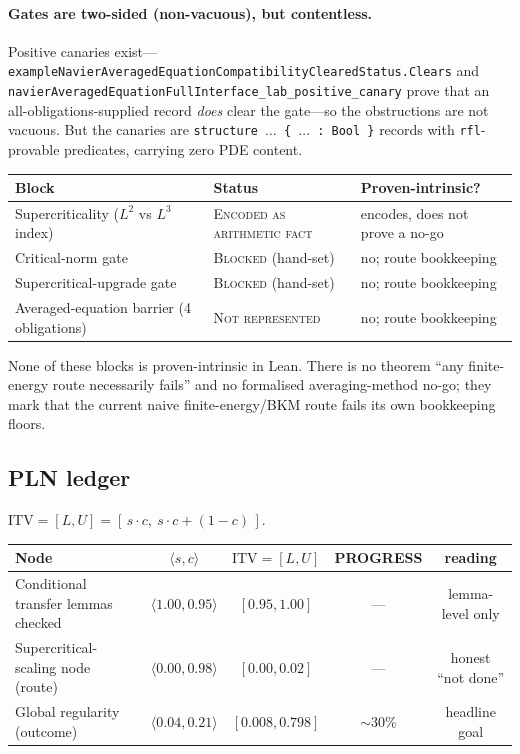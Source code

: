 \paragraph{Gates are two-sided (non-vacuous), but contentless.} Positive
canaries exist---\texttt{exampleNavierAveragedEquationCompatibilityClearedStatus.Clears}
and \texttt{navierAveragedEquationFullInterface\_lab\_positive\_canary} prove
that an all-obligations-supplied record \emph{does} clear the gate---so the
obstructions are not vacuous. But the canaries are
\texttt{structure $\dots$ \{ $\dots$ : Bool \}} records with \texttt{rfl}-provable
predicates, carrying zero PDE content.

\begin{center}
\begin{tabular}{lll}
\hline
Block & Status & Proven-intrinsic? \\
\hline
Supercriticality ($L^2$ vs $L^3$ index) & \textsc{Encoded as arithmetic fact} & encodes, does not prove a no-go \\
Critical-norm gate & \textsc{Blocked} (hand-set) & no; route bookkeeping \\
Supercritical-upgrade gate & \textsc{Blocked} (hand-set) & no; route bookkeeping \\
Averaged-equation barrier (4 obligations) & \textsc{Not represented} & no; route bookkeeping \\
\hline
\end{tabular}
\end{center}

\noindent None of these blocks is proven-intrinsic in Lean. There is no theorem
``any finite-energy route necessarily fails'' and no formalised averaging-method
no-go; they mark that the current naive finite-energy/BKM route fails its own
bookkeeping floors.

\subsection{PLN ledger}
\label{sec:ns-pln}

$\mathrm{ITV}=[L,U]=[\,s\cdot c,\ s\cdot c+(1-c)\,]$.

\begin{center}
\begin{tabular}{lcccc}
\hline
Node & $\langle s,c\rangle$ & $\mathrm{ITV}=[L,U]$ & PROGRESS & reading \\
\hline
Conditional transfer lemmas checked & $\langle 1.00,0.95\rangle$ & $[0.95,1.00]$ & --- & lemma-level only \\
Supercritical-scaling node (route) & $\langle 0.00,0.98\rangle$ & $[0.00,0.02]$ & --- & honest ``not done'' \\
Global regularity (outcome) & $\langle 0.04,0.21\rangle$ & $[0.008,0.798]$ & $\sim 30\%$ & headline goal \\
\hline
\end{tabular}
\end{center}

